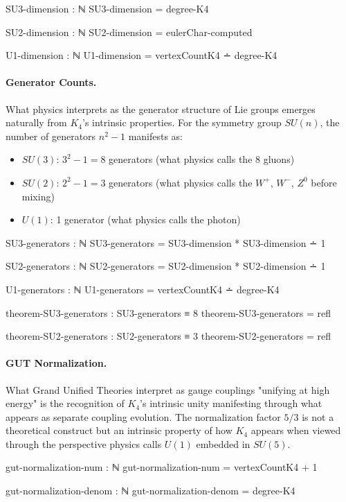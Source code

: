 \documentclass[11pt,a4paper]{book}
\begin{document}
\begin{code}
SU3-dimension : ℕ
SU3-dimension = degree-K4

SU2-dimension : ℕ
SU2-dimension = eulerChar-computed

U1-dimension : ℕ
U1-dimension = vertexCountK4 ∸ degree-K4
\end{code}

\paragraph{Generator Counts.}
What physics interprets as the generator structure of Lie groups emerges naturally from $K_4$'s intrinsic properties. For the symmetry group $SU(n)$, the number of generators $n^2 - 1$ manifests as:
\begin{itemize}
\item $SU(3)$: $3^2 - 1 = 8$ generators (what physics calls the 8 gluons)
\item $SU(2)$: $2^2 - 1 = 3$ generators (what physics calls the $W^+$, $W^-$, $Z^0$ before mixing)
\item $U(1)$: 1 generator (what physics calls the photon)
\end{itemize}

\begin{code}
SU3-generators : ℕ
SU3-generators = SU3-dimension * SU3-dimension ∸ 1

SU2-generators : ℕ
SU2-generators = SU2-dimension * SU2-dimension ∸ 1


U1-generators : ℕ
U1-generators = vertexCountK4 ∸ degree-K4

theorem-SU3-generators : SU3-generators ≡ 8
theorem-SU3-generators = refl

theorem-SU2-generators : SU2-generators ≡ 3
theorem-SU2-generators = refl
\end{code}

\paragraph{GUT Normalization.}
What Grand Unified Theories interpret as gauge couplings "unifying at high energy" is the recognition of $K_4$'s intrinsic unity manifesting through what appears as separate coupling evolution. The normalization factor $5/3$ is not a theoretical construct but an intrinsic property of how $K_4$ appears when viewed through the perspective physics calls $U(1)$ embedded in $SU(5)$.

\begin{code}
gut-normalization-num : ℕ
gut-normalization-num = vertexCountK4 + 1

gut-normalization-denom : ℕ
gut-normalization-denom = degree-K4
\end{code}
\end{document}
